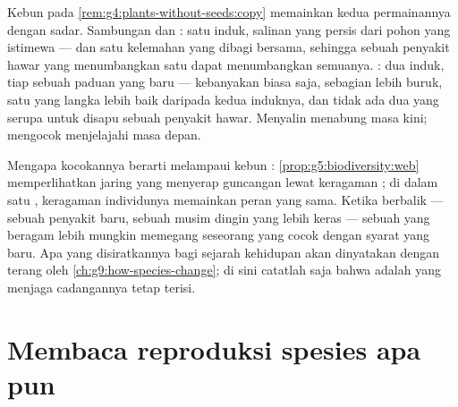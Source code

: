 \begin{example}\label{ex:g8:sexual-reproduction:bets}
Kebun  pada \cref{rem:g4:plants-without-seeds:copy} memainkan
kedua permainannya dengan sadar. Sambungan dan : satu induk,
salinan yang persis dari pohon yang istimewa --- dan satu kelemahan
yang dibagi bersama, sehingga sebuah penyakit hawar yang menumbangkan
satu dapat menumbangkan semuanya. : dua induk, tiap 
sebuah paduan yang baru --- kebanyakan biasa saja, sebagian lebih
buruk, satu yang langka lebih baik daripada kedua induknya, dan tidak
ada dua yang serupa untuk disapu sebuah penyakit hawar. Menyalin
menabung masa kini; mengocok menjelajahi masa depan.
\end{example}

\begin{remark}\label{rem:g8:sexual-reproduction:reserve}
Mengapa kocokannya berarti melampaui kebun :
\cref{prop:g5:biodiversity:web} memperlihatkan jaring yang menyerap
guncangan lewat keragaman ; di dalam satu , keragaman
individunya memainkan peran yang sama. Ketika  berbalik ---
sebuah penyakit baru, sebuah musim dingin yang lebih keras --- sebuah
 yang beragam lebih mungkin memegang seseorang yang cocok
dengan syarat yang baru. Apa yang disiratkannya bagi sejarah kehidupan
akan dinyatakan dengan terang oleh
\cref{ch:g9:how-species-change}; di sini catatlah saja bahwa
 adalah yang menjaga cadangannya tetap terisi.
\end{remark}

\section{Membaca reproduksi spesies apa pun}

